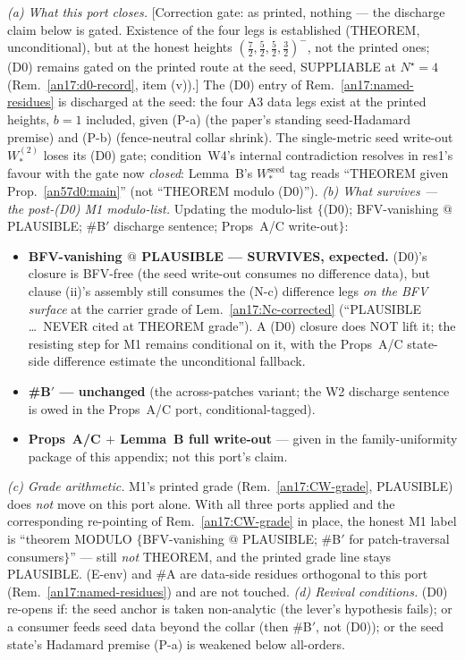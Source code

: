 \begin{remark}\label{an57d0:modulo}
\emph{(a) What this port closes.} \textup{[Correction gate: as printed, nothing
--- the discharge claim below is gated. Existence of the four legs is established
(THEOREM, unconditional), but at the honest heights
$(\tfrac72,\tfrac52,\tfrac52,\tfrac32)^-$, not the printed ones; (D0) remains
gated on the printed route at the seed, SUPPLIABLE at $N^\star{=}4$
(Rem.\ \ref{an17:d0-record}, item (v)).]} The (D0) entry of Rem.~\ref{an17:named-residues} is discharged at the seed: the four A3 data legs exist at
the printed heights, $b{=}1$ included, given (P-a) (the paper's standing
seed-Hadamard premise) and (P-b) (fence-neutral collar shrink). The
single-metric seed write-out $W^{(2)}_*$ loses its (D0) gate; condition~W4's internal contradiction resolves in res1's favour with the gate now
\emph{closed}: Lemma~B's $W_*^{\mathrm{seed}}$ tag reads ``THEOREM given
Prop.~\ref{an57d0:main}'' (not ``THEOREM modulo (D0)'').
\emph{(b) What survives --- the post-(D0) M1 modulo-list.} Updating the
modulo-list $\{$(D0); BFV-vanishing $@$ PLAUSIBLE; \#B$'$
discharge sentence; Props~A/C write-out$\}$:
\begin{itemize}[leftmargin=*,nosep]
\item \textbf{BFV-vanishing $@$ PLAUSIBLE --- SURVIVES, expected.} (D0)'s
  closure is BFV-free (the seed write-out consumes no difference data),
  but clause (ii)'s assembly still consumes the (N-c) difference legs
  \emph{on the BFV surface} at the carrier grade of Lem.\
  \ref{an17:Nc-corrected} (``PLAUSIBLE \dots\ NEVER cited at
  THEOREM grade''). A (D0) closure does NOT lift it; the resisting step for M1 remains
  conditional on it, with the Props~A/C state-side difference estimate the
  unconditional fallback.
\item \textbf{\#B$'$ --- unchanged} (the across-patches variant; the
  W2 discharge sentence is owed in the Props~A/C port, conditional-tagged).
\item \textbf{Props~A/C $+$ Lemma~B full write-out} --- given in the
  family-uniformity package of this appendix; not this port's claim.
\end{itemize}
\emph{(c) Grade arithmetic.} M1's printed grade (Rem.~\ref{an17:CW-grade}, PLAUSIBLE)
does \emph{not} move on this port alone. With all three ports
applied and the corresponding re-pointing of Rem.~\ref{an17:CW-grade} in place, the honest M1 label is
``theorem MODULO $\{$BFV-vanishing $@$ PLAUSIBLE; \#B$'$ for
patch-traversal consumers$\}$'' --- still \emph{not} THEOREM, and the
printed grade line stays PLAUSIBLE. (E-env) and \#A are data-side residues
orthogonal to this port (Rem.~\ref{an17:named-residues}) and are not
touched. \emph{(d) Revival conditions.} (D0) re-opens if: the seed anchor
is taken non-analytic (the lever's hypothesis fails); or a consumer feeds
seed data beyond the collar (then \#B$'$, not (D0)); or the seed state's
Hadamard premise (P-a) is weakened below all-orders.
\end{remark}
